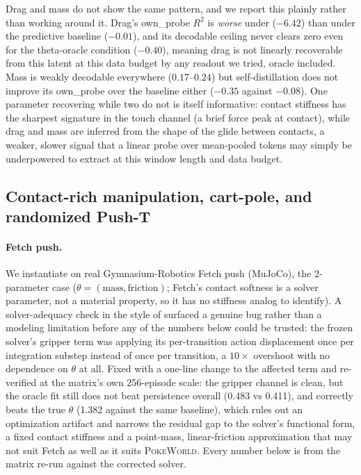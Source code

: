 Drag and mass do not show the same pattern, and we report this
plainly rather than working around it. Drag's own\_probe $R^2$ is
\emph{worse} under \method ($-6.42$) than under the predictive baseline
($-0.01$), and its decodable ceiling never clears zero even for the
theta-oracle condition ($-0.40$), meaning drag is not linearly
recoverable from this latent at this data budget by any readout we
tried, oracle included. Mass is weakly decodable everywhere
($0.17$--$0.24$) but self-distillation does not improve its own\_probe
over the baseline either ($-0.35$ against $-0.08$). One parameter
recovering while two do not is itself informative: contact stiffness has
the sharpest signature in the touch channel (a brief force peak at
contact), while drag and mass are inferred from the shape of the glide
between contacts, a weaker, slower signal that a linear probe over
mean-pooled tokens may simply be underpowered to extract at this window
length and data budget.

\subsection{Contact-rich manipulation, cart-pole, and randomized Push-T}
\label{sec:results-other-benchmarks}

\paragraph{Fetch push.} We instantiate \method on real Gymnasium-Robotics
Fetch push (MuJoCo), the 2-parameter case
($\theta = (\mathrm{mass}, \mathrm{friction})$; Fetch's contact softness
is a solver parameter, not a material property, so it has no stiffness
analog to identify). A solver-adequacy check in the style of
 surfaced a genuine bug rather than a modeling
limitation before any of the numbers below could be trusted: the frozen
solver's gripper term was applying its per-transition action
displacement once per integration substep instead of once per
transition, a $10\times$ overshoot with no dependence on $\theta$ at
all. Fixed with a one-line change to the affected term and re-verified
at the matrix's own 256-episode scale: the gripper channel is clean,
but the oracle fit still does not beat persistence overall (0.483 vs
0.411), and correctly beats the true $\theta$ (1.382 against the same
baseline), which rules out an optimization artifact and narrows the
residual gap to the solver's functional form, a fixed contact stiffness
and a point-mass, linear-friction approximation that may not suit Fetch
as well as it suits \textsc{PokeWorld}. Every number below is from the
matrix re-run against the corrected solver.

